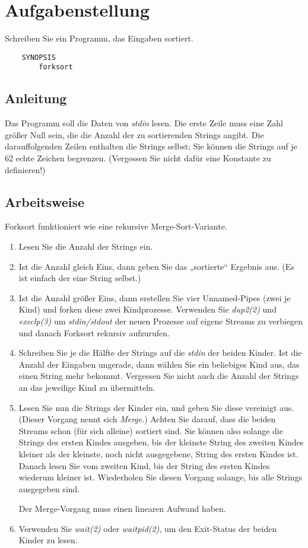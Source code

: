 




\section*{Aufgabenstellung}
Schreiben Sie ein Programm, das Eingaben sortiert.
\begin{verbatim}
    SYNOPSIS
        forksort
\end{verbatim}

\subsection*{Anleitung}
Das Programm soll die Daten von \emph{stdin} lesen. Die erste Zeile muss eine
Zahl größer Null sein, die die Anzahl der zu sortierenden Strings angibt.
Die darauffolgenden Zeilen enthalten die Strings selbst; Sie können die
Strings auf je 62 echte Zeichen begrenzen. (Vergessen Sie nicht dafür eine
Konstante zu definieren!)

\subsection*{Arbeitsweise}
Forksort funktioniert wie eine rekursive Merge-Sort-Variante.
\begin{enumerate}
\item Lesen Sie die Anzahl der Strings ein.
\item Ist die Anzahl gleich Eins, dann geben Sie das „sortierte“
  Ergebnis aus. (Es ist einfach der eine String selbst.)
\item Ist die Anzahl größer Eins, dann erstellen Sie vier Unnamed-Pipes (zwei
  je Kind) und forken diese zwei Kindprozesse. Verwenden Sie \emph{dup2(2)} und
  \emph{execlp(3)} um \emph{stdin/stdout} der neuen Prozesse auf eigene Streams
  zu verbiegen und danach Forksort rekursiv aufzurufen.
\item Schreiben Sie je die Hälfte der Strings auf die \emph{stdin} der
  beiden Kinder. Ist die Anzahl der Eingaben ungerade, dann wählen Sie
  ein beliebiges Kind aus, das einen String mehr bekommt. Vergessen Sie nicht
  auch die Anzahl der Strings an das jeweilige Kind zu übermitteln.
\item Lesen Sie nun die Strings der Kinder ein, und geben Sie diese vereinigt
  aus. (Dieser Vorgang nennt sich \emph{Merge}.) Achten Sie darauf, dass die
  beiden Streams schon (für sich alleine) sortiert sind. Sie können also
  solange die Strings des ersten Kindes ausgeben, bis der kleinste String des
  zweiten Kindes kleiner als der kleinste, noch nicht ausgegebene, String des
  ersten Kindes ist. Danach lesen Sie vom zweiten Kind, bis der String des
  ersten Kindes wiederum kleiner ist. Wiederholen Sie diesen Vorgang solange,
  bis alle Strings ausgegeben sind.

  Der Merge-Vorgang muss einen linearen Aufwand haben.
\item Verwenden Sie \emph{wait(2)} oder \emph{waitpid(2)}, um den Exit-Status
  der beiden Kinder zu lesen.
\end{enumerate}

